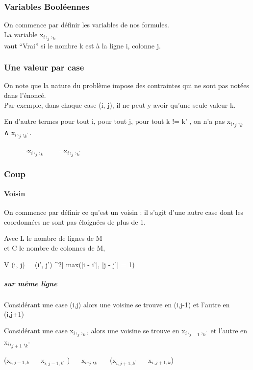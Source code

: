 \documentclass[utf8]{article}
\begin{document}
\subsubsection{Variables  Booléennes}

On commence par définir les variables de nos formules.
\\La variable x$_i,_j,_k$
\\vaut “Vrai” si le nombre k est à la ligne i, colonne j.

\subsubsection{Une valeur par case}
On note que la nature du problème impose des contraintes qui ne sont pas notées dans l’énoncé.
\\Par exemple, dans chaque case (i, j), il ne peut y avoir qu’une seule valeur k.

En d’autre termes pour tout i,
pour tout j, pour tout k != k'
, on n’a pas x$_i,_j,_k$ ∧ x$_i,_j,_{k^\prime}$.

~~
~~
¬x$_i,_j,_k$ ~ \lor ~ ¬x$_i,_j,_{k^\prime}$

\subsubsection{Coup}

\paragraph{Voisin}
On commence par définir ce qu’est un voisin : il s’agit d’une autre case dont les coordonnées ne sont pas éloignées de plus de 1.

Avec L le nombre de lignes de M
\\et C le nombre de colonnes de M,

V (i, j) = {(i', j') \in [1, N]^2| max(|i - i'|, |j - j'| = 1)}


\subparagraph{sur même ligne}
Considérant une case (i,j)
alors une voisine se trouve en (i,j-1)
et l'autre en (i,j+1)

Considérant une case x$_i,_j,_k$, alors une voisine se trouve en x$_i,_{j-1},_{k^\prime}$ et l'autre en x$_i,_{j+1},_{k^{\prime\prime}}$

(x$_{i,{j-1},k}$ \lor ~~ x$_{i,{j-1},{k^\prime}}$ )
\land ~~
x$_i,_j,_k$
\land ~~
(x$_{i,{j+1},{k^{\prime}}}$ \lor ~~ x$_{i,{j+1},k}$)
\end{document}
